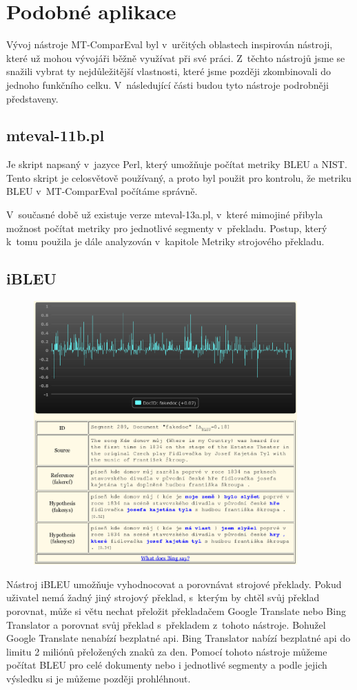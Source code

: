\section{Podobné aplikace}
Vývoj nástroje \mbox{MT-ComparEval} byl v~určitých oblastech inspirován nástroji,
  které už mohou vývojáři běžně využívat při své práci.
Z~těchto nástrojů jsme se snažili vybrat ty nejdůležitější vlastnosti,
  které jsme později zkombinovali do jednoho funkčního celku.
V~následující části budou tyto nástroje podrobněji představeny.

\subsection{mteval-11b.pl}
Je skript napsaný v~jazyce Perl,
  který umožňuje počítat metriky BLEU a NIST.
Tento skript je celosvětově používaný,
  a proto byl použit pro kontrolu,
  že metriku BLEU v~\mbox{MT-ComparEval} počítáme správně.

V~současné době už existuje verze mteval-13a.pl,
  v~které mimojiné přibyla možnost počítat metriky pro jednotlivé segmenty v~překladu.
Postup, který k~tomu použila je dále analyzován v~kapitole Metriky strojového překladu.

\subsection{iBLEU}
\begin{figure}[h]
  \center
  \includegraphics[width=0.9\textwidth]{img/ibleu.eps}
\end{figure}
Nástroj iBLEU umožňuje vyhodnocovat a porovnávat strojové překlady.
Pokud uživatel nemá žadný jiný strojový překlad,
  s~kterým by chtěl svůj překlad porovnat,
  může si větu nechat přeložit překladačem Google Translate nebo Bing Translator
  a porovnat svůj překlad s~překladem z~tohoto nástroje.
Bohužel Google Translate nenabízí bezplatné api.
Bing Translator nabízí bezplatné api do limitu 2 miliónů přeložených znaků za den.
Pomocí tohoto nástroje můžeme počítat BLEU pro celé dokumenty nebo i jednotlivé segmenty
  a podle jejich výsledku si je můžeme později prohléhnout.

